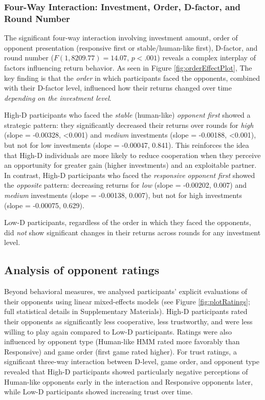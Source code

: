 \documentclass[
]{article}
\begin{document}
\subsubsection{Four-Way Interaction: Investment, Order, D-factor, and Round Number}\label{four-way-interaction-investment-order-d-factor-and-round-number}

The significant four-way interaction involving investment amount, order of opponent presentation (responsive first or stable/human-like first), D-factor, and round number (\(F(1, 8209.77) = 14.07\), \(p < .001\)) reveals a complex interplay of factors influencing return behavior.
As seen in Figure \ref{fig:orderEffectPlot}, The key finding is that the \emph{order} in which participants faced the opponents, combined with their D-factor level, influenced how their returns changed over time \emph{depending on the investment level}.

High-D participants who faced the \emph{stable} (human-like) \emph{opponent} \emph{first} showed a strategic pattern: they significantly decreased their returns over rounds for \emph{high} (slope = -0.00328, \textless0.001) and \emph{medium} investments (slope = -0.00188, \textless0.001), but not for low investments (slope = -0.00047, 0.841).
This reinforces the idea that High-D individuals are more likely to reduce cooperation when they perceive an opportunity for greater gain (higher investments) and an exploitable partner.
In contrast, High-D participants who faced the \emph{responsive} \emph{opponent} \emph{first} showed the \emph{opposite} pattern: decreasing returns for \emph{low} (slope = -0.00202, 0.007) and \emph{medium} investments (slope = -0.00138, 0.007), but not for high investments (slope = -0.00075, 0.629).

Low-D participants, regardless of the order in which they faced the opponents, did \emph{not} show significant changes in their returns across rounds for any investment level.

\subsection{Analysis of opponent ratings}\label{analysis-of-opponent-ratings}

Beyond behavioral measures, we analysed participants' explicit evaluations of their opponents using linear mixed-effects models (see Figure \ref{fig:plotRatings}; full statistical details in Supplementary Materials).
High-D participants rated their opponents as significantly less cooperative, less trustworthy, and were less willing to play again compared to Low-D participants.
Ratings were also influenced by opponent type (Human-like HMM rated more favorably than Responsive) and game order (first game rated higher).
For trust ratings, a significant three-way interaction between D-level, game order, and opponent type revealed that High-D participants showed particularly negative perceptions of Human-like opponents early in the interaction and Responsive opponents later, while Low-D participants showed increasing trust over time.
\end{document}

